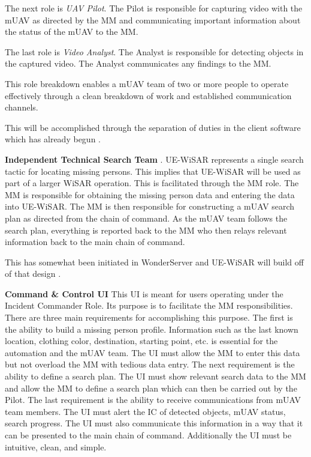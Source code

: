 \documentclass[12pt]{IEEEtran}
\begin{document}
The next role is \emph{UAV Pilot}.  The Pilot is responsible for capturing video with the
mUAV as directed by the MM and communicating important information about the
status of the mUAV to the MM.  

The last role is \emph{Video Analyst}.  The
Analyst is responsible for detecting objects in the captured video.
The Analyst communicates any findings to the MM.  

This role breakdown enables a
mUAV team of two or more people to operate effectively through a clean breakdown
of work and established communication channels.

This will be accomplished through the separation of duties in the client
software which has already begun \cite{uavCode, serverCode}.

\textbf{Independent Technical Search Team}
\cite{adams2009cognitive}.
UE-WiSAR represents a single search tactic for locating missing persons.  This
implies that UE-WiSAR will be used as part of a larger WiSAR operation.  This is
facilitated through the MM role.
The MM is responsible for obtaining the missing person data and entering the
data into UE-WiSAR.  The MM is then responsible for constructing a mUAV search
plan as directed from the chain of command.  As the mUAV team follows the
search plan, everything is reported back to the MM who then relays relevant
information back to the main chain of command.  

This has somewhat been initiated in WonderServer and UE-WiSAR will build off of
that design \cite{serverCode}.

\textbf{Command \& Control UI} This UI is meant for users operating under the
Incident Commander Role.  Its purpose is to facilitate the MM responsibilities. 
There are three main requirements for accomplishing this purpose.  The first is the ability to build a missing person profile. 
Information such as the last known location, clothing color, destination,
starting point, etc. is essential for the automation and the mUAV team. 
The UI must allow the MM to enter this data but not overload the MM with tedious
data entry.  The next requirement is the ability to define a search plan.  The
UI must show relevant search data to the MM and allow the MM to define a search
plan which can then be carried out by the Pilot.  The
last requirement is the ability to receive communications from mUAV team members.  The UI must alert the
IC of detected objects, mUAV status, search progress.  The UI must also
communicate this information in a way that it can be presented to the main chain
of command.  Additionally the UI must be intuitive, clean, and simple.
\end{document}
